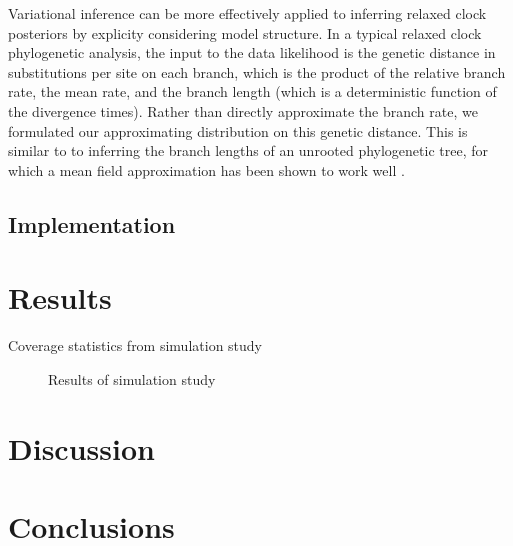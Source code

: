 Variational inference can be more effectively applied to inferring relaxed clock posteriors by explicity considering model structure. In a typical relaxed clock phylogenetic analysis, the input to the data likelihood is the genetic distance in substitutions per site on each branch, which is the product of the relative branch rate, the mean rate, and the branch length (which is a deterministic function of the divergence times). Rather than directly approximate the branch rate, we formulated our approximating distribution on this genetic distance. This is similar to to inferring the branch lengths of an unrooted phylogenetic tree, for which a mean field approximation has been shown to work well \cite{zhang2018variational}.


\subsection*{Implementation}

\section*{Results}

\begin{table}
    \centering
    \caption{Coverage statistics from simulation study}
    \label{tab:coverage}
\end{table}


\begin{figure}
    \centering
    \caption{Results of simulation study}
    \label{fig:coverage}
\end{figure}

\section*{Discussion}

\section*{Conclusions}

